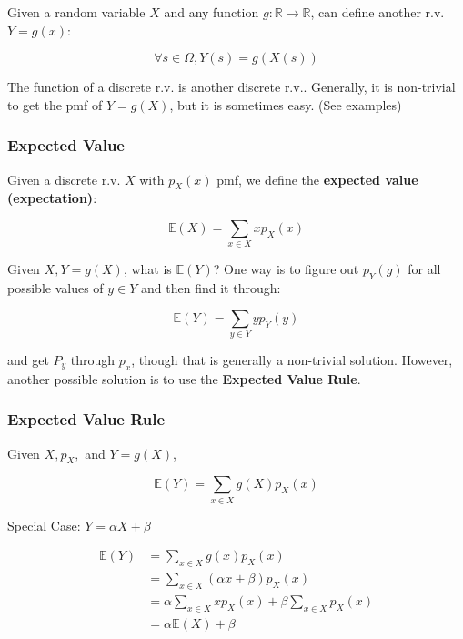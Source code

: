 \documentclass{article}
\begin{document}
Given a random variable $X$ and any function $g : \mathbb{R}
\rightarrow \mathbb{R}$, can define another r.v. $Y = g(x)$:

\[
  \forall s \in \Omega, Y(s) = g(X(s))
\]

The function of a discrete r.v. is another discrete r.v.. Generally,
it is non-trivial to get the pmf of $Y=g(X)$, but it is sometimes
easy. (See examples)

\subsubsection{Expected Value}

Given a discrete r.v. $X$ with $p_X(x)$ pmf, we define the
\textbf{expected value (expectation)}:

\begin{equation}
  \tag{Expected Value Definition}
  \boxed{
    \mathbb{E}(X) = \sum\limits_{x \in X} x p_X(x)
  }
\end{equation}

Given $X, Y = g(X)$, what is $\mathbb{E}(Y)$? One way is to figure out
$p_Y(g)$ for all possible values of $y \in Y$ and then find it
through:

\[
  \mathbb{E}(Y) = \sum\limits_{y \in Y} y p_Y(y)
\]

and get $P_y$ through $p_x$, though that is generally a non-trivial
solution. However, another possible solution is to use the
\textbf{Expected Value Rule}.

\subsubsection{Expected Value Rule}

Given $X, p_X,$ and $Y=g(X)$,

\begin{equation}
  \tag{Expected Value Rule}
  \boxed{
    \mathbb{E}(Y) = \sum\limits_{x \in X} g(X) p_X(x)
  }
\end{equation}

Special Case: $Y = \alpha X + \beta$

\[
  \begin{aligned}
    \mathbb{E}(Y)
    &= \sum\limits_{x \in X} g(x) p_X(x) \\
    &= \sum\limits_{x \in X} (\alpha x + \beta) p_X(x) \\
    &= \alpha \sum\limits_{x \in X} x p_X(x) + \beta \sum\limits_{x
      \in X} p_X(x) \\
    &= \alpha \mathbb{E}(X) + \beta    
  \end{aligned}
\]
\end{document}
